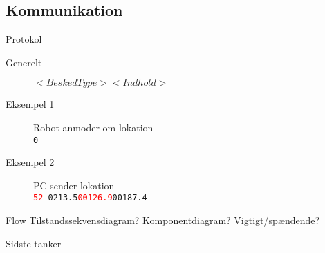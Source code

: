 \subsection{Kommunikation}

\begin{frame}{Protokol}
\begin{description}
\item[Generelt]{$< BeskedType >< Indhold >$}
\item[Eksempel 1]{Robot anmoder om lokation\\
\texttt{0}}
\item[Eksempel 2]{PC sender lokation\\
\texttt{\textcolor{red}{52}-0213.5\textcolor{red}{00126.9}00187.4}}
\end{description}
\end{frame}

\begin{frame}{Flow}
Tilstandssekvensdiagram? Komponentdiagram? Vigtigt/spændende?
\end{frame}

\begin{frame}{Sidste tanker}
\end{frame}
